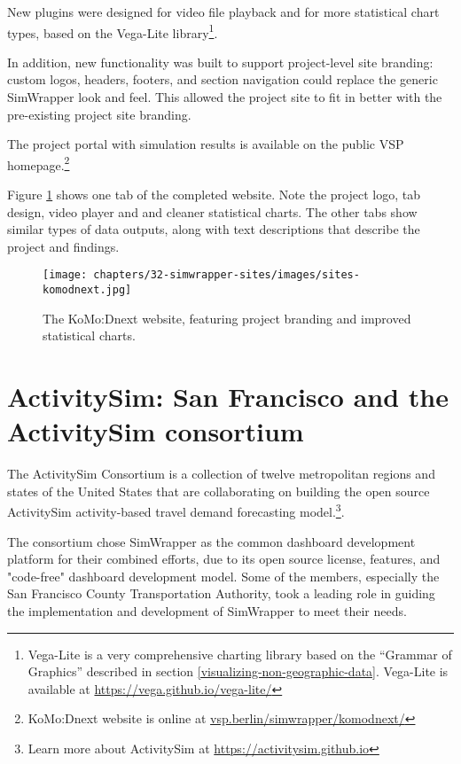 New plugins were designed for video file playback and for more statistical chart types, based on the Vega-Lite library\footnote{Vega-Lite is a very comprehensive charting library based on the ``Grammar of Graphics'' described in section \ref{visualizing-non-geographic-data}. Vega-Lite is available at \url{https://vega.github.io/vega-lite/}}.

In addition, new functionality was built to support project-level site branding: custom logos, headers, footers, and section navigation could replace the generic SimWrapper look and feel. This allowed the project site to fit in better with the pre-existing project site branding.

The project portal with simulation results is available on the public VSP homepage.\footnote{KoMo:Dnext website is online at \href{https://vsp.berlin/simwrapper/komodnext/}{vsp.berlin/simwrapper/komodnext/}}

Figure \ref{fig:sites-komodnext} shows one tab of the completed website. Note the project logo, tab design, video player and and cleaner statistical charts. The other tabs show similar types of data outputs, along with text descriptions that describe the project and findings.

\begin{figure}[ht]
  \centering
  \texttt{[image: chapters/32-simwrapper-sites/images/sites-komodnext.jpg]}
  \caption{The KoMo:Dnext website, featuring project branding and improved statistical charts.}
  \label{fig:sites-komodnext}
\end{figure}

\section{ActivitySim: San Francisco and the ActivitySim consortium}
\label{sites-activitysim}

The ActivitySim Consortium is a collection of twelve metropolitan regions and states of the United States that are collaborating on building the open source ActivitySim activity-based travel demand forecasting model.\footnote{Learn more about ActivitySim at \url{https://activitysim.github.io}}.

The consortium chose SimWrapper as the common dashboard development platform for their combined efforts, due to its open source license, features, and "code-free" dashboard development model. Some of the members, especially the San Francisco County Transportation Authority, took a leading role in guiding the implementation and development of SimWrapper to meet their needs.

